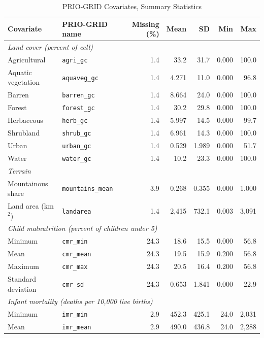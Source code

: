 \documentclass[11pt, letterpaper]{article}
\begin{document}
\begin{table}[!htbp]
\centering
\caption{PRIO-GRID Covariates, Summary Statistics}
\label{tab:prio_summary}
\small
\begin{tabular}{llrrrrr}
\hline
Covariate & PRIO-GRID name & Missing (\%) & Mean & SD & Min & Max \\
\hline
\multicolumn{7}{l}{\textit{Land cover (percent of cell)}} \\
\quad Agricultural & \texttt{agri\_gc} & 1.4 & 33.2 & 31.7 & 0.000 & 100.0 \\
\quad Aquatic vegetation & \texttt{aquaveg\_gc} & 1.4 & 4.271 & 11.0 & 0.000 & 96.8 \\
\quad Barren & \texttt{barren\_gc} & 1.4 & 8.664 & 24.0 & 0.000 & 100.0 \\
\quad Forest & \texttt{forest\_gc} & 1.4 & 30.2 & 29.8 & 0.000 & 100.0 \\
\quad Herbaceous & \texttt{herb\_gc} & 1.4 & 5.997 & 14.5 & 0.000 & 99.7 \\
\quad Shrubland & \texttt{shrub\_gc} & 1.4 & 6.961 & 14.3 & 0.000 & 100.0 \\
\quad Urban & \texttt{urban\_gc} & 1.4 & 0.529 & 1.989 & 0.000 & 51.7 \\
\quad Water & \texttt{water\_gc} & 1.4 & 10.2 & 23.3 & 0.000 & 100.0 \\
\multicolumn{7}{l}{\textit{Terrain}} \\
\quad Mountainous share & \texttt{mountains\_mean} & 3.9 & 0.268 & 0.355 & 0.000 & 1.000 \\
\quad Land area (km$^2$) & \texttt{landarea} & 1.4 & 2,415 & 732.1 & 0.003 & 3,091 \\
\multicolumn{7}{l}{\textit{Child malnutrition (percent of children under 5)}} \\
\quad Minimum & \texttt{cmr\_min} & 24.3 & 18.6 & 15.5 & 0.000 & 56.8 \\
\quad Mean & \texttt{cmr\_mean} & 24.3 & 19.5 & 15.9 & 0.200 & 56.8 \\
\quad Maximum & \texttt{cmr\_max} & 24.3 & 20.5 & 16.4 & 0.200 & 56.8 \\
\quad Standard deviation & \texttt{cmr\_sd} & 24.3 & 0.653 & 1.841 & 0.000 & 22.9 \\
\multicolumn{7}{l}{\textit{Infant mortality (deaths per 10,000 live births)}} \\
\quad Minimum & \texttt{imr\_min} & 2.9 & 452.3 & 425.1 & 24.0 & 2,031 \\
\quad Mean & \texttt{imr\_mean} & 2.9 & 490.0 & 436.8 & 24.0 & 2,288 \\

\end{tabular}
\end{table}
\end{document}

